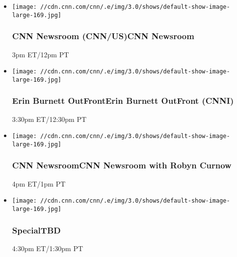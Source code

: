 \begin{itemize}
\item
  \texttt{[image: //cdn.cnn.com/cnn/.e/img/3.0/shows/default-show-image-large-169.jpg]}

  \hypertarget{cnn-newsroom-cnnuscnn-newsroom-}{%
  \subsubsection{CNN Newsroom (CNN/US)CNN Newsroom
  }\label{cnn-newsroom-cnnuscnn-newsroom-}}

  3pm ET/12pm PT
\end{itemize}

\begin{itemize}
\item
  \texttt{[image: //cdn.cnn.com/cnn/.e/img/3.0/shows/default-show-image-large-169.jpg]}

  \hypertarget{erin-burnett-outfronterin-burnett-outfront-cnni--1}{%
  \subsubsection{Erin Burnett OutFrontErin Burnett OutFront (CNNI)
  }\label{erin-burnett-outfronterin-burnett-outfront-cnni--1}}

  3:30pm ET/12:30pm PT
\end{itemize}

\begin{itemize}
\item
  \texttt{[image: //cdn.cnn.com/cnn/.e/img/3.0/shows/default-show-image-large-169.jpg]}

  \hypertarget{cnn-newsroomcnn-newsroom-with-robyn-curnow--1}{%
  \subsubsection{CNN NewsroomCNN Newsroom with Robyn Curnow
  }\label{cnn-newsroomcnn-newsroom-with-robyn-curnow--1}}

  4pm ET/1pm PT
\end{itemize}

\begin{itemize}
\item
  \texttt{[image: //cdn.cnn.com/cnn/.e/img/3.0/shows/default-show-image-large-169.jpg]}

  \hypertarget{specialtbd--2}{%
  \subsubsection{SpecialTBD }\label{specialtbd--2}}

  4:30pm ET/1:30pm PT
\end{itemize}

